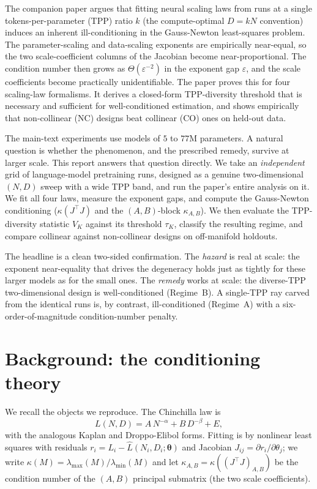 \documentclass[11pt]{article}
\newcommand{\kAB}{\kappa_{A,B}}
\begin{document}
The companion paper argues that fitting neural scaling laws from runs at a single
tokens-per-parameter (TPP) ratio $k$ (the compute-optimal $D=kN$ convention) induces an inherent
ill-conditioning in the Gauss-Newton least-squares problem. The parameter-scaling and
data-scaling exponents are empirically near-equal, so the two scale-coefficient columns of the
Jacobian become near-proportional. The condition number then grows as $\Theta(\varepsilon^{-2})$
in the exponent gap $\varepsilon$, and the scale coefficients become practically unidentifiable.
The paper proves this for four scaling-law formalisms. It derives a closed-form TPP-diversity
threshold that is necessary and sufficient for well-conditioned estimation, and shows empirically
that non-collinear (NC) designs beat collinear (CO) ones on held-out data.

The main-text experiments use models of $5$ to $77$M parameters. A natural question is
whether the phenomenon, and the prescribed remedy, survive at larger scale. This report answers
that question directly. We take an \emph{independent} grid of language-model pretraining runs,
designed as a genuine two-dimensional $(N,D)$ sweep with a wide TPP band, and run the paper's
entire analysis on it. We fit all four laws, measure the exponent gaps, and compute the
Gauss-Newton conditioning ($\kappa(J^\top J)$ and the $(A,B)$-block $\kAB$). We then evaluate the
TPP-diversity statistic $V_K$ against its threshold $\tau_K$, classify the resulting regime, and
compare collinear against non-collinear designs on off-manifold holdouts.

The headline is a clean two-sided confirmation. The \emph{hazard} is real at scale: the exponent
near-equality that drives the degeneracy holds just as tightly for these larger models as for the
small ones. The \emph{remedy} works at scale: the diverse-TPP two-dimensional design is
well-conditioned (Regime~B). A single-TPP ray carved from the identical runs is, by contrast,
ill-conditioned (Regime~A) with a six-order-of-magnitude condition-number penalty.

\section{Background: the conditioning theory}
\label{sec:background}

We recall the objects we reproduce. The Chinchilla law is
\begin{equation}
  L(N,D)=A\,N^{-\alpha}+B\,D^{-\beta}+E,
  \label{eq:chin}
\end{equation}
with the analogous Kaplan and Droppo-Elibol forms. Fitting is by nonlinear least squares with
residuals $r_i=L_i-\hat L(N_i,D_i;\boldsymbol\theta)$ and Jacobian $J_{ij}=\partial r_i/\partial
\theta_j$; we write $\kappa(M)=\lambda_{\max}(M)/\lambda_{\min}(M)$ and let $\kAB=\kappa((J^\top
J)_{A,B})$ be the condition number of the $(A,B)$ principal submatrix (the two scale
coefficients).
\end{document}
